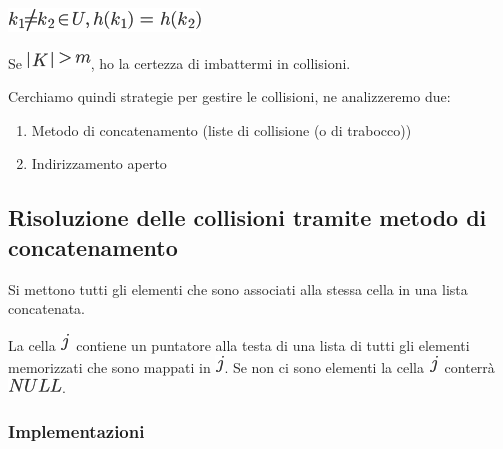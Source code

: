 \documentclass{article}
\providecommand{\tightlist}{%
  \setlength{\itemsep}{0pt}\setlength{\parskip}{0pt}}
\begin{document}
\includegraphics{images/image237.png}

{}

{Se }\includegraphics{images/image238.png}{, ho la certezza di
imbattermi in collisioni.}

{}

{Cerchiamo quindi strategie per gestire le collisioni, ne analizzeremo
due:}

\begin{enumerate}
\tightlist
\item
  {Metodo di concatenamento (liste di collisione (o di trabocco))}
\item
  {Indirizzamento aperto}
\end{enumerate}

{}

{}

\hypertarget{h.ocrobrrshwsz}{\subsection{\texorpdfstring{{Risoluzione
delle collisioni tramite metodo di
concatenamento}}{Risoluzione delle collisioni tramite metodo di concatenamento}}\label{h.ocrobrrshwsz}}

{Si mettono tutti gli elementi che sono associati alla stessa cella in
una lista concatenata.}

{}

{La cella }\includegraphics{images/image239.png}{~contiene un puntatore
alla testa di una lista di tutti gli elementi memorizzati che sono
mappati in }\includegraphics{images/image239.png}{. Se non ci sono
elementi la cella }\includegraphics{images/image239.png}{~conterrà
}\includegraphics{images/image240.png}{.}

{}

\hypertarget{h.lhp1y3nzdu6x}{\subsubsection{\texorpdfstring{{Implementazioni}}{Implementazioni}}\label{h.lhp1y3nzdu6x}}
\end{document}
